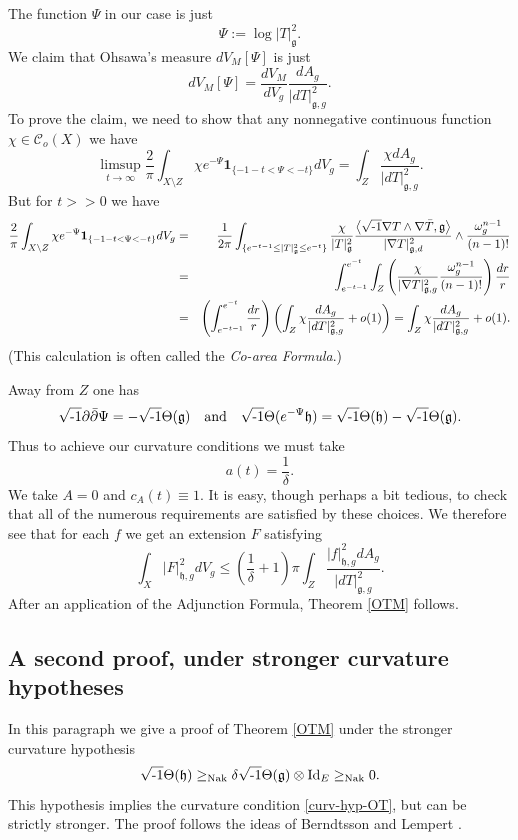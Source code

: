 \documentclass[12pt,hidelinks]{amsart}
\newcommand{\sC}{{\mathscr C}}
\newcommand{\fg}{{\mathfrak g}}
\newcommand{\fh}{{\mathfrak h}}
\newcommand{\di}{\partial}
\newcommand{\dbar}{\bar \partial}
\newcommand{\ii}{\sqrt{\text{\rm -}1}}
\newcommand{\tensor}{\otimes}
\begin{document}
The function $\Psi$ in our case is just 
\[
\Psi := \log |T|^2_{\fg}.
\]
We claim that Ohsawa's measure $dV_M[\Psi]$ is just 
\[
dV_M[\Psi] = \frac{dV_M}{dV_g}\frac{dA_g}{|dT|^2_{\fg, g}}.
\]
To prove the claim, we need to show that any nonnegative continuous function $\chi \in \sC_o(X)$ we have 
\[
\limsup _{t \to \infty} \frac{2}{\pi} \int _{X\setminus Z} \chi e^{-\Psi}\mathbf{1}_{\{-1-t< \Psi < -t\}} dV_g = \int _Z \frac{\chi dA_g}{|dT|^2_{\fg,g}}.
\]
But for $t >> 0$ we have 
\begin{eqnarray*}
\frac{2}{\pi} \int _{X\setminus Z} \chi e^{-\Psi}\mathbf{1}_{\{-1-t< \Psi < -t\}} dV_g
&=& \frac{1}{2 \pi}  \int _{\{ e^{-t-1} \le |T|^2_{\fg} \le e^{-t}\}} \frac{\chi}{|T|^2_{\fg}} \frac{\left < \ii \nabla T \wedge \nabla \bar T, \fg \right > }{|\nabla T|^2_{\fg,d}} \wedge \frac{ \omega _g ^{n-1}}{(n-1)!}\\
&=& \int _{e^{-t-1}}^{e^{-t}} \int _Z\left ( \frac{\chi}{|\nabla T|^2_{\fg,g}} \frac{\omega_g^{n-1}}{(n-1)!} \right ) \frac{dr}{r} \\
&= & \left (\int _{e^{-t-1}}^{e^{-t}} \frac{dr}{r} \right ) \left ( \int _Z  \chi \frac{dA_g}{|dT|^2_{\fg, g}}  + o (1) \right ) = \int _Z  \chi \frac{dA_g}{|dT|^2_{\fg, g}} + o(1).
\end{eqnarray*}
(This calculation is often called the \emph{Co-area Formula}.)


Away from $Z$ one has 
\[
\ii \di \dbar \Psi = - \ii\Theta (\fg) \quad \text{and} \quad \ii \Theta (e^{-\Psi}\fh) = \ii \Theta (\fh) - \ii \Theta (\fg).
\]
Thus to achieve our curvature conditions we must take 
\[
a(t) = \frac{1}{\delta}.
\]
We take $A=0$ and $c_A (t) \equiv 1$.  It is easy, though perhaps a bit tedious, to check that all of the numerous requirements are satisfied by these choices.  We therefore see that for each $f$ we get an extension $F$ satisfying 
\[
\int _X |F|^2_{\fh, g} dV_g \le \left ( \frac{1}{\delta} + 1\right ) \pi \int _Z \frac{|f|^2_{\fh,g} dA_g}{|dT|^2_{\fg,g}}.
\]
After an application of the Adjunction Formula, Theorem \ref{OTM} follows.


\subsection{A second proof, under stronger curvature hypotheses}

In this paragraph we give a proof of Theorem \ref{OTM} under the stronger curvature hypothesis 
\begin{equation}\label{curv-hyp-OTBL-vb-c}
\ii \Theta (\fh) \ge_{{\rm Nak}} \delta \ii \Theta (\fg) \tensor {\rm Id}_E\ge_{{\rm Nak}} 0.
\end{equation}
This hypothesis implies the curvature condition \eqref{curv-hyp-OT}, but can be strictly stronger.  The proof follows the ideas of Berndtsson and Lempert \cite{bl}.
\end{document}
